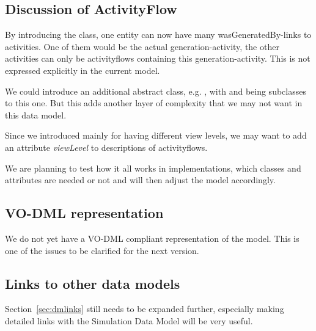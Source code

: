 
\subsection{Discussion of ActivityFlow}
By introducing the  class, one entity can now have many 
wasGeneratedBy-links to activities. One of them would be the actual generation-activity, 
the other activities can only be activityflows containing this generation-activity.
This is not expressed explicitly in the current model. 

We could introduce an additional abstract class, e.g. , with  and 
 being subclasses to this one. But this adds another layer of complexity 
that we may not want in this data model.

Since we introduced  mainly for having different view levels, 
we may want to add an attribute \emph{viewLevel} to descriptions of activityflows.

We are planning to test how it all works in implementations, which classes and attributes are 
needed or not and will then adjust the model 
accordingly.

\subsection{VO-DML representation}
We do not yet have a VO-DML compliant representation of the model. This is one 
of the issues to be clarified for the next version.

\subsection{Links to other data models}
Section~\ref{sec:dmlinks} still needs to be expanded further, especially making detailed links with the 
Simulation Data Model will be very useful.
